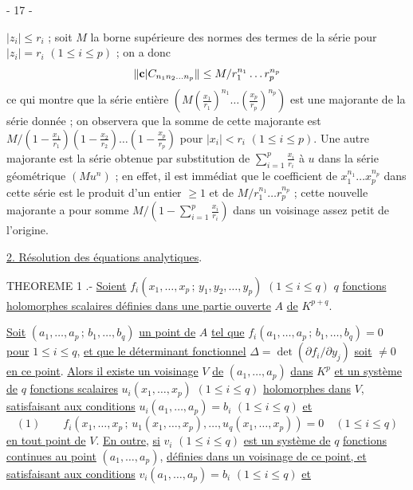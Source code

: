 \begin{center}
- 17 -
\end{center}

$|z_i|\leq r_i$ ; soit $M$ la borne supérieure des normes des termes de la série
pour $|z_i|=r_i$ $(1\leq i\leq p)$ ; on a donc
\[
\|\mathbf c|C_{n_1n_2\ldots n_p}\|\leq M/r_1^{n_1}\ldots r_p^{n_p}
\]
ce qui montre que la série entière
$(M(\frac{x_1}{r_1})^{n_1}\ldots(\frac{x_p}{r_p})^{n_p})$
est une majorante de la série donnée ; on observera que la somme de cette majorante
est $M/(1-\frac{x_1}{r_1})(1-\frac{x_2}{r_2})\ldots(1-\frac{x_p}{r_p})$
pour $|x_i|<r_i$ $(1\leq i\leq p)$.
Une autre majorante est la série obtenue par substitution de
$\sum_{i=1}^p\frac{x_i}{r_i}$ à $u$ dans la série géométrique $(Mu^n)$ ;
en effet, il est immédiat que le coefficient de $x_1^{n_1}\ldots x_p^{n_p}$
dans cette série est le produit d'un entier $\geq1$ et de
$M/r_1^{n_1}\ldots r_p^{n_p}$ ; cette nouvelle majorante a pour somme
$M/(1-\sum_{i=1}^p\frac{x_i}{r_i})$ dans un voisinage assez petit de l'origine.

\uline{2. Résolution des équations analytiques}.

THEOREME 1 .- \uline{Soient}
$f_i(x_1,\ldots,x_p\,;\,y_1,y_2,\ldots,y_p)$ $(1\leq i\leq q)$
$q$ \uline{fonctions holomorphes scalaires définies dans une partie ouverte}
$A$ \uline{de} $K^{p+q}$.

\uline{Soit} $(a_1,\ldots,a_p\,;\,b_1,\ldots,b_q)$ \uline{un point de}
$A$ \uline{tel que}
$f_i(a_1,\ldots,a_p\,;\,b_1,\ldots,b_q)=0$ \uline{pour} $1\leq i\leq q$,
\uline{et que le déterminant fonctionnel}
$\Delta=\det(\partial f_i/\partial y_j)$ \uline{soit}
$\neq0$ \uline{en ce point}.
\uline{Alors il existe un voisinage} $V$ \uline{de} $(a_1,\ldots,a_p)$
\uline{dans} $K^p$ \uline{et un système de} $q$ \uline{fonctions scalaires}
$u_i(x_1,\ldots,x_p)$ $(1\leq i\leq q)$
\uline{holomorphes dans} $V$, \uline{satisfaisant aux conditions}
$u_i(a_1,\ldots,a_p)=b_i$ $(1\leq i\leq q)$ \uline{et}
\[
(1)\qquad
f_i(x_1,\ldots,x_p\,;\,u_1(x_1,\ldots,x_p),\ldots,u_q(x_1,\ldots,x_p))=0
\quad(1\leq i\leq q)
\]
\uline{en tout point de} $V$.
\uline{En outre}, \uline{si} $v_i$ $(1\leq i\leq q)$ \uline{est un système de}
$q$ \uline{fonctions continues au point} $(a_1,\ldots,a_p)$,
\uline{définies dans un voisinage de ce point, et satisfaisant aux conditions}
$v_i(a_1,\ldots,a_p)=b_i$ $(1\leq i\leq q)$ \uline{et}


